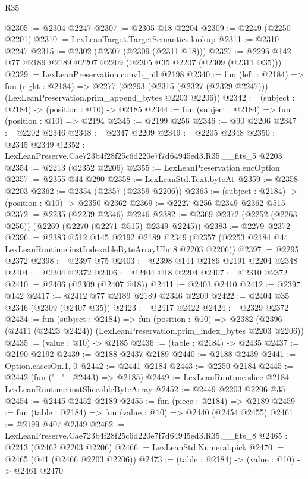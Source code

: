 \begin{lexlean}{R35}
\begin{coremodule}
@2305 := @2304 @2247
@2307 := @2305 @18 @2204
@2309 := @2249 (@2250 @2201)
@2310 := LexLeanTarget.TargetSemantics.lookup
@2311 := @2310 @2247
@2315 := @2302 (@2307 (@2309 (@2311 @18)))
@2327 := @2296 @142 @77 @2189 @2189 @2207 @2209 (@2305 @35 @2207 (@2309 (@2311 @35)))
@2329 := LexLeanPreservation.convL_nil @2198
@2340 := fun (left : @2184) =>
  fun (right : @2184) =>
  @2277 (@2293 (@2315 (@2327 (@2329 @2247))) (LexLeanPreservation.prim_append_bytes @2203 @2206))
@2342 := (subject : @2184) -> (position : @10) -> @2185
@2344 := fun (subject : @2184) => fun (position : @10) => @2194
@2345 := @2199 @256
@2346 := @90 @2206
@2347 := @2202 @2346
@2348 := @2347 @2209
@2349 := @2205 @2348
@2350 := @2345 @2349
@2352 := LexLeanPreserve.Cae723b4f28f25c6d220e7f7d64945ed3.R35.__fits_5 @2203
@2354 := @2213 (@2352 @2206)
@2355 := LexLeanPreservation.encOption
@2357 := @2355 @44 @290
@2358 := LexLeanStd.Text.byteAt
@2359 := @2358 @2203
@2362 := @2354 (@2357 (@2359 @2206))
@2365 := (subject : @2184) -> (position : @10) -> @2350 @2362
@2369 := @2227 @256 @2349 @2362 @515
@2372 := @2235 (@2239 @2346) @2246
@2382 := @2369 @2372 (@2252 (@2263 @256)) (@2269 (@2270 (@2271 @515) @2349 @2245))
@2383 := @2279 @2372
@2396 := @2383
    @512
    @145
    @2192
    @2189
    @2349
    (@2357 (@2253 @2184 @44 LexLeanRuntime.instIndexableByteArrayUInt8 @2203 @2206))
@2397 := @2295 @2372
@2398 := @2397 @75
@2403 := @2398 @144 @2189 @2191 @2204 @2348
@2404 := @2304 @2372
@2406 := @2404 @18 @2204
@2407 := @2310 @2372
@2410 := @2406 (@2309 (@2407 @18))
@2411 := @2403 @2410
@2412 := @2397 @142
@2417 := @2412 @77 @2189 @2189 @2346 @2209
@2422 := @2404 @35 @2346 (@2309 (@2407 @35))
@2423 := @2417 @2422
@2424 := @2329 @2372
@2434 := fun (subject : @2184) =>
  fun (position : @10) =>
  @2382 (@2396 (@2411 (@2423 @2424)) (LexLeanPreservation.prim_index_bytes @2203 @2206))
@2435 := (value : @10) -> @2185
@2436 := (table : @2184) -> @2435
@2437 := @2190 @2192
@2439 := @2188 @2437 @2189
@2440 := @2188 @2439
@2441 := Option.casesOn.{1, 0}
@2442 := @2441 @2184
@2443 := @2250 @2184
@2445 := @2442 (fun ("_" : @2443) => @2185)
@2449 := LexLeanRuntime.slice @2184 LexLeanRuntime.instSliceableByteArray
@2452 := @2449 @2203 @2206 @35
@2454 := @2445 @2452 @2189
@2455 := fun (piece : @2184) => @2189
@2459 := fun (table : @2184) => fun (value : @10) => @2440 (@2454 @2455)
@2461 := @2199 @407 @2349
@2462 := LexLeanPreserve.Cae723b4f28f25c6d220e7f7d64945ed3.R35.__fits_8
@2465 := @2213 (@2462 @2203 @2206)
@2466 := LexLeanStd.Numeral.pick
@2470 := @2465 (@41 (@2466 @2203 @2206))
@2473 := (table : @2184) -> (value : @10) -> @2461 @2470

\end{coremodule}
\end{lexlean}

